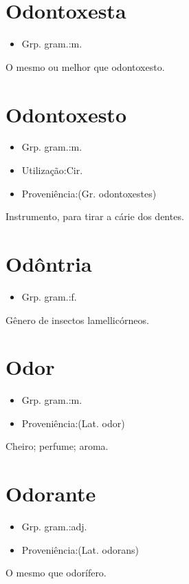\section{Odontoxesta}
\begin{itemize}
\item {Grp. gram.:m.}
\end{itemize}
O mesmo ou melhor que \textunderscore odontoxesto\textunderscore .
\section{Odontoxesto}
\begin{itemize}
\item {Grp. gram.:m.}
\end{itemize}
\begin{itemize}
\item {Utilização:Cir.}
\end{itemize}
\begin{itemize}
\item {Proveniência:(Gr. \textunderscore odontoxestes\textunderscore )}
\end{itemize}
Instrumento, para tirar a cárie dos dentes.
\section{Odôntria}
\begin{itemize}
\item {Grp. gram.:f.}
\end{itemize}
Gênero de insectos lamellicórneos.
\section{Odor}
\begin{itemize}
\item {Grp. gram.:m.}
\end{itemize}
\begin{itemize}
\item {Proveniência:(Lat. \textunderscore odor\textunderscore )}
\end{itemize}
Cheiro; perfume; aroma.
\section{Odorante}
\begin{itemize}
\item {Grp. gram.:adj.}
\end{itemize}
\begin{itemize}
\item {Proveniência:(Lat. \textunderscore odorans\textunderscore )}
\end{itemize}
O mesmo que \textunderscore odorífero\textunderscore .
